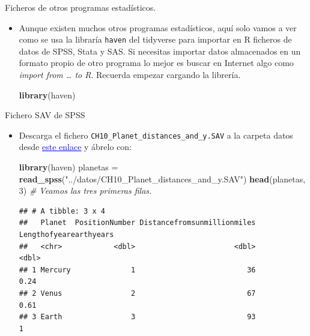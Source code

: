 \documentclass[
  9pt,
  ignorenonframetext,
]{beamer}
\newenvironment{Shaded}{\begin{snugshade}}{\end{snugshade}}
\newcommand{\CommentTok}[1]{\textcolor[rgb]{0.56,0.35,0.01}{\textit{#1}}}
\newcommand{\DecValTok}[1]{\textcolor[rgb]{0.00,0.00,0.81}{#1}}
\newcommand{\KeywordTok}[1]{\textcolor[rgb]{0.13,0.29,0.53}{\textbf{#1}}}
\newcommand{\NormalTok}[1]{#1}
\newcommand{\StringTok}[1]{\textcolor[rgb]{0.31,0.60,0.02}{#1}}
\begin{document}
\begin{frame}[fragile]{Ficheros de otros programas estadísticos.}
\protect\hypertarget{ficheros-de-otros-programas-estadisticos.}{}

\begin{itemize}
\item
  Aunque existen muchos otros programas estadísticos, aquí solo vamos a
  ver como se usa la libraría \texttt{haven} del tidyverse para importar
  en R ficheros de datos de SPSS, Stata y SAS. Si necesitas importar
  datos almacenados en un formato propio de otro programa lo mejor es
  buscar en Internet algo como \emph{import from \ldots{} to R}.
  Recuerda empezar cargando la librería.

\begin{Shaded}
\begin{Highlighting}[]
\KeywordTok{library}\NormalTok{(haven)}
\end{Highlighting}
\end{Shaded}
\end{itemize}

\begin{block}{Fichero SAV de SPSS}

\begin{itemize}
\item
  Descarga el fichero \texttt{CH10\_Planet\_distances\_and\_y.SAV} a la
  carpeta datos desde
  \href{http://media.pearsoncmg.com/aw/aw_deveaux_stats_2/activstats/spss/CH10_Planet_distances_and_y.SAV}{\textcolor{blue}{\underline{este enlace}}}
  y ábrelo con: \scriptsize

\begin{Shaded}
\begin{Highlighting}[]
\KeywordTok{library}\NormalTok{(haven)}
\NormalTok{planetas =}\StringTok{ }\KeywordTok{read_spss}\NormalTok{(}\StringTok{"../datos/CH10_Planet_distances_and_y.SAV"}\NormalTok{)}
\KeywordTok{head}\NormalTok{(planetas, }\DecValTok{3}\NormalTok{) }\CommentTok{# Veamos las tres primeras filas.}
\end{Highlighting}
\end{Shaded}

\begin{verbatim}
## # A tibble: 3 x 4
##   Planet  PositionNumber Distancefromsunmillionmiles Lengthofyearearthyears
##   <chr>            <dbl>                       <dbl>                  <dbl>
## 1 Mercury              1                          36                   0.24
## 2 Venus                2                          67                   0.61
## 3 Earth                3                          93                   1
\end{verbatim}
\end{itemize}

\normalsize

\end{block}

\end{frame}
\end{document}
